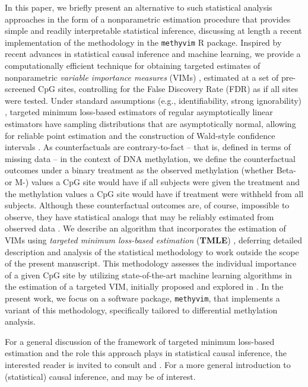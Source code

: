\documentclass[9pt,a4paper,]{extarticle}
\theoremstyle{definition}
\theoremstyle{definition}
\theoremstyle{definition}
\theoremstyle{remark}
\begin{document}
In this paper, we briefly present an alternative to such statistical analysis
approaches in the form of a nonparametric estimation procedure that provides
simple and readily interpretable statistical inference, discussing at length a
recent implementation of the methodology in the \texttt{methyvim} R package. Inspired
by recent advances in statistical causal inference and machine learning, we
provide a computationally efficient technique for obtaining targeted estimates
of nonparametric \emph{variable importance measures} (VIMs) \citep{vdl2006statistical},
estimated at a set of pre-screened CpG sites, controlling for the False
Discovery Rate (FDR) as if all sites were tested. Under standard assumptions
(e.g., identifiability, strong ignorability) \citep{pearl2009causality}, targeted
minimum loss-based estimators of regular asymptotically linear estimators have
sampling distributions that are asymptotically normal, allowing for reliable
point estimation and the construction of Wald-style confidence intervals
\citep[\citet{vdl2018targeted}]{vdl2011targeted}. As counterfactuals are contrary-to-fact --
that is, defined in terms of missing data -- in the context of DNA methylation,
we define the counterfactual outcomes under a binary treatment as the observed
methylation (whether Beta- or M-) values a CpG site would have if all subjects
were given the treatment and the methylation values a CpG site would have if
treatment were withheld from all subjects. Although these counterfactual
outcomes are, of course, impossible to observe, they have statistical analogs
that may be reliably estimated from observed data \citep{pearl2009causality}. We
describe an algorithm that incorporates the estimation of VIMs using \emph{targeted
minimum loss-based estimation} (\textbf{TMLE}) \citep{vdl2006targeted}, deferring detailed
description and analysis of the statistical methodology to work outside the
scope of the present manuscript. This methodology assesses the individual
importance of a given CpG site by utilizing state-of-the-art machine learning
algorithms in the estimation of a targeted VIM, initially proposed and explored
in \citep{tuglus2008targeted}. In the present work, we focus on a software package,
\texttt{methyvim}, that implements a variant of this methodology, specifically tailored
to differential methylation analysis.

For a general discussion of the framework of targeted minimum loss-based
estimation and the role this approach plays in statistical causal inference, the
interested reader is invited to consult \citet{vdl2011targeted} and \citet{vdl2018targeted}.
For a more general introduction to (statistical) causal inference,
\citet{pearl2009causality} and \citet{hernan2018causal} may be of interest.
\end{document}
